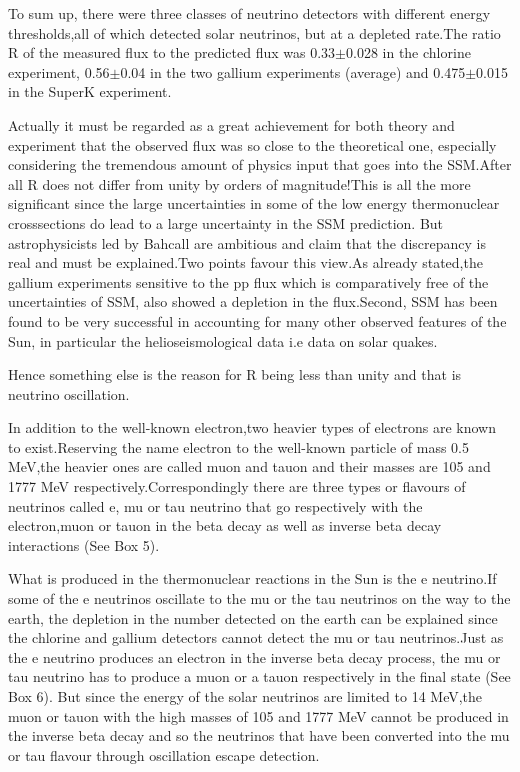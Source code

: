 To sum up, there were three classes of neutrino detectors with
different energy thresholds,all of which detected solar neutrinos,
but at a depleted rate.The ratio R of the measured flux to the
predicted flux was 0.33$\pm$0.028 in the chlorine experiment,
0.56$\pm$0.04 in the two gallium experiments (average) and
0.475$\pm$0.015 in the SuperK experiment.

Actually it must be regarded as a great achievement for both
theory and experiment that the observed flux was so close to the
theoretical one, especially considering the tremendous amount of
physics input that goes into the SSM.After all R does not differ
from unity by orders of magnitude!This is all the more significant
since the large uncertainties in some of the low energy thermonuclear
crosssections do lead to a large uncertainty in the SSM prediction.
But astrophysicists led by Bahcall are ambitious and claim
that the discrepancy is real and must be explained.Two points
favour this view.As already stated,the gallium experiments
sensitive to the pp flux which is comparatively free of the
uncertainties of SSM, also showed a depletion in the flux.Second,
SSM has been found to be very successful in accounting for many
other observed features of the Sun, in particular the 
helioseismological data i.e data on solar quakes.

Hence something else is the reason for R being less than unity
and that is neutrino oscillation.

In addition to the well-known electron,two heavier types of
electrons are known to exist.Reserving the name electron to
the well-known particle of mass 0.5 MeV,the heavier ones are
called muon and tauon and their masses are 105 and 1777 MeV
respectively.Correspondingly there are three types or flavours
of neutrinos called e, mu or tau neutrino that go respectively with the
electron,muon or tauon in the beta decay as well as
inverse beta decay interactions (See Box 5).

What is produced in the thermonuclear reactions in the Sun
is the e neutrino.If some of the e neutrinos oscillate
to the mu or the tau neutrinos on the way to the earth,
the depletion in the number detected on the earth can be
explained since the chlorine and gallium detectors cannot
detect the mu or tau neutrinos.Just as the e neutrino
produces an electron in the inverse beta decay process,
the mu or tau neutrino has to produce a muon or a tauon
respectively in the final state (See Box 6). But since the energy of the
solar neutrinos are limited to 14 MeV,the muon or tauon with
the high masses of 105 and 1777 MeV cannot be produced in
the inverse beta decay and so the neutrinos that have been
converted into the mu or tau flavour through oscillation
escape detection.

